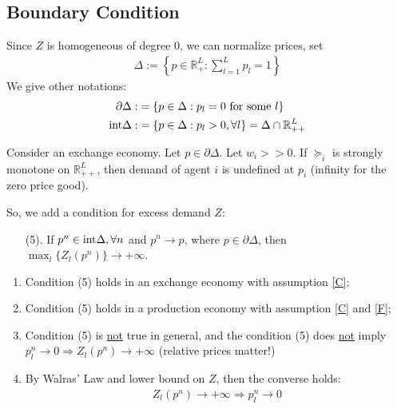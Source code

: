 \documentclass[11pt]{elegantbook}
\begin{document}
\subsection{Boundary Condition}
Since $Z$ is homogeneous of degree $0$, we can normalize prices, set
\begin{equation}
    \begin{aligned}
        \Delta:=\left\{p\in \mathbb{R}^L_+:\sum_{l=1}^Lp_l=1\right\}
    \end{aligned}
    \nonumber
\end{equation}
We give other notations:
\begin{equation}
    \begin{aligned}
        \partial\Delta:&=\left\{p\in \Delta: p_l=0 \textnormal{ for some }l\right\}\\
        \textnormal{int}\Delta:&=\left\{p\in \Delta: p_l>0, \forall l\right\}=\Delta\cap \mathbb{R}^L_{++}\\
    \end{aligned}
    \nonumber
\end{equation}

Consider an exchange economy. Let $p\in \partial \Delta$. Let $w_i>>0$. If $\succeq_i$ is strongly monotone on $\mathbb{R}^L_{++}$, then demand of agent $i$ is undefined at $p_i$ (infinity for the zero price good).

So, we add a condition for excess demand $Z$:
\begin{definition}[Condition (5)]
    \normalfont
    \begin{enumerate}
        \item[(5).] If $p^n\in \textnormal{int}\Delta, \forall n$ and $p^n \rightarrow p$, where $p\in \partial \Delta$, then $\max_l\{Z_l(p^n)\}\rightarrow +\infty$.
    \end{enumerate}
\end{definition}
\begin{note}
    \begin{enumerate}[-]
        \item Condition (5) holds in an exchange economy with assumption \ref{C};
        \item Condition (5) holds in a production economy with assumption \ref{C} and \ref{F};
        \item Condition (5) is \underline{not} true in general, and the condition (5) does \underline{not} imply $p^n_l \rightarrow 0 \Rightarrow Z_l(p^n) \rightarrow +\infty$ (relative prices matter!)
        \item By Walras' Law and lower bound on $Z$, then the converse holds:
        \begin{equation}
            \begin{aligned}
                Z_l(p^n)\rightarrow +\infty \Rightarrow p^n_l \rightarrow 0
            \end{aligned}
            \nonumber
        \end{equation}
    \end{enumerate}
\end{note}
\end{document}
